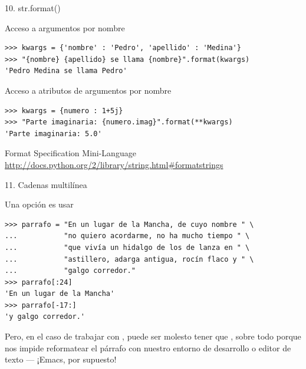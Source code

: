 \documentclass[14pt]{beamer}
\begin{document}
\begin{frame}[fragile]{10. str.format()}
  \footnotesize
  \begin{exampleblock}
    {Acceso a argumentos por nombre}
    \scriptsize
    \begin{lstlisting}
>>> kwargs = {'nombre' : 'Pedro', 'apellido' : 'Medina'}
>>> "{nombre} {apellido} se llama {nombre}".format(kwargs)
'Pedro Medina se llama Pedro'
    \end{lstlisting}
  \end{exampleblock}

  \begin{exampleblock}
    {Acceso a atributos de argumentos por nombre}
    \scriptsize
    \begin{lstlisting}
>>> kwargs = {numero : 1+5j}
>>> "Parte imaginaria: {numero.imag}".format(**kwargs)
'Parte imaginaria: 5.0'
    \end{lstlisting}
  \end{exampleblock}

  \small
  \begin{block}
    {\centering Format Specification Mini-Language}
    \footnotesize
    \centering
    \url{http://docs.python.org/2/library/string.html#formatstrings}
  \end{block}
\end{frame}

\begin{frame}[fragile]{11. Cadenas multilínea}

  \begin{block}{}
    \centering \large
    Una opción es usar 
  \end{block}

  \begin{exampleblock}{}
    \scriptsize
    \begin{lstlisting}
>>> parrafo = "En un lugar de la Mancha, de cuyo nombre " \
...           "no quiero acordarme, no ha mucho tiempo " \
...           "que vivía un hidalgo de los de lanza en " \
...           "astillero, adarga antigua, rocín flaco y " \
...           "galgo corredor."
>>> parrafo[:24]
'En un lugar de la Mancha'
>>> parrafo[-17:]
'y galgo corredor.'
    \end{lstlisting}
  \end{exampleblock}

  \begin{alertblock}{}
    \centering
    \small
    Pero, en el caso de trabajar con ,
    puede ser molesto tener que , sobre todo porque nos impide reformatear el
    párrafo con nuestro entorno de desarrollo o editor de texto ---
    ¡Emacs, por supuesto!
  \end{alertblock}
\end{frame}
\end{document}
